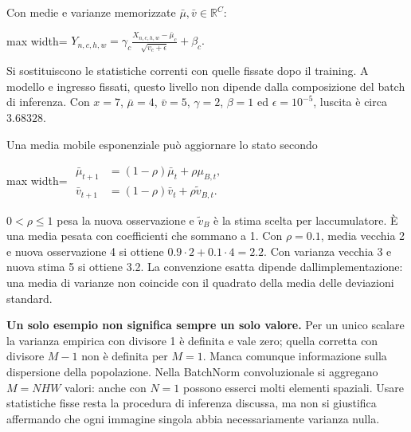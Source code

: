 \documentclass[11pt,a4paper,oneside,openany]{book}
\begin{document}
Con medie e varianze memorizzate \(\bar\mu,\bar v\in\mathbb{R}^C\):

\begin{center}
\begin{adjustbox}{max width=\linewidth}
$\displaystyle \boxed{Y_{n,c,h,w}=\gamma_c\frac{X_{n,c,h,w}-\bar\mu_c}{\sqrt{\bar v_c+\epsilon}}+\beta_c.}$
\end{adjustbox}
\end{center}

Si sostituiscono le statistiche correnti con quelle fissate dopo il training. A modello e ingresso fissati, questo livello non dipende dalla composizione del batch di inferenza. Con \(x=7\), \(\bar\mu=4\), \(\bar v=5\), \(\gamma=2\), \(\beta=1\) ed \(\epsilon=10^{-5}\), l\textquotesingle uscita è circa \(3.68328\).

Una media mobile esponenziale può aggiornare lo stato secondo

\begin{center}
\begin{adjustbox}{max width=\linewidth}
$\displaystyle \boxed{\begin{aligned}
\bar\mu_{t+1}&=(1-\rho)\bar\mu_t+\rho\mu_{B,t},\\
\bar v_{t+1}&=(1-\rho)\bar v_t+\rho\widetilde v_{B,t}.
\end{aligned}}$
\end{adjustbox}
\end{center}

\(0<\rho\leq1\) pesa la nuova osservazione e \(\widetilde v_B\) è la stima scelta per l\textquotesingle accumulatore. È una media pesata con coefficienti che sommano a 1. Con \(\rho=0.1\), media vecchia 2 e nuova osservazione 4 si ottiene \(0.9\cdot2+0.1\cdot4=2.2\). Con varianza vecchia 3 e nuova stima 5 si ottiene 3.2. La convenzione esatta dipende dall\textquotesingle implementazione: una media di varianze non coincide con il quadrato della media delle deviazioni standard.

\textbf{Un solo esempio non significa sempre un solo valore.} Per un unico scalare la varianza empirica con divisore 1 è definita e vale zero; quella corretta con divisore \(M-1\) non è definita per \(M=1\). Manca comunque informazione sulla dispersione della popolazione. Nella BatchNorm convoluzionale si aggregano \(M=NHW\) valori: anche con \(N=1\) possono esserci molti elementi spaziali. Usare statistiche fisse resta la procedura di inferenza discussa, ma non si giustifica affermando che ogni immagine singola abbia necessariamente varianza nulla.
\end{document}
